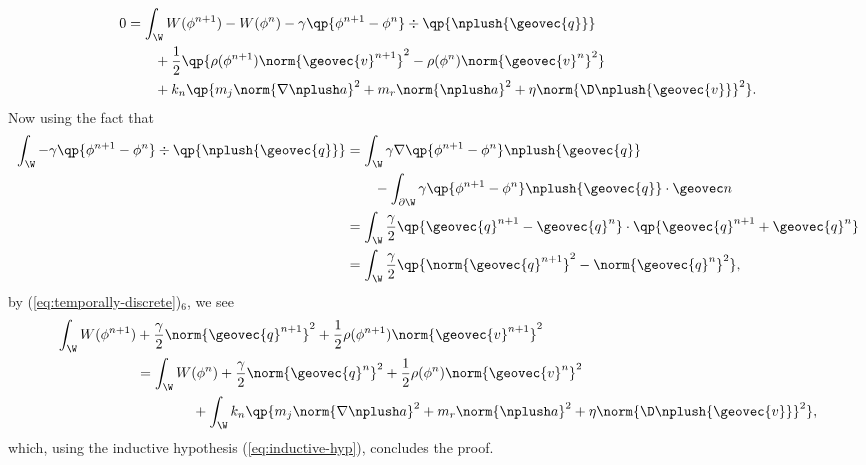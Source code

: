 \documentclass[final]{amsart}
\numberwithin{equation}{section}
\begin{document}
\begin{Proof}
\begin{equation}
    \begin{split}
      0
      &=
      \int_\W
      W(\phi^{n+1}) - W(\phi^n)
      -
      \gamma \qp{\phi^{n+1} - \phi^n} \div\qp{\nplush {{\geovec{q}}}}
      \\
      &\qquad +
      \frac{1}{2}\qp{\rho(\phi^{n+1})\norm{{\geovec{v}}^{n+1}}^2 - \rho(\phi^n) \norm{{\geovec{v}}^n}^2}    
      \\
      &\qquad 
      +
      k_n \qp{m_j\norm{\nabla \nplush a}^2
        +
        m_r \norm{\nplush a}^2
        +
        \eta \norm{\D \nplush{{\geovec{v}}}}^2}.
    \end{split}
  \end{equation}
  Now using the fact that
  \begin{equation}
    \begin{split}
      \int_\W - \gamma \qp{\phi^{n+1} - \phi^n} \div\qp{\nplush {{\geovec{q}}}} &= 
      \int_\W \gamma \nabla \qp{\phi^{n+1} - \phi^n}
      \nplush {{\geovec{q}}}
      \\
      &\qquad
      - 
      \int_{\partial\W} \gamma \qp{\phi^{n+1} - \phi^n}
      \nplush {{\geovec{q}}} \cdot \geovec n
      \\
      &=
      \int_\W \frac{\gamma}{2} \qp{{\geovec{q}}^{n+1} - {\geovec{q}}^n} \cdot
      \qp{{\geovec{q}}^{n+1} + {\geovec{q}}^n}
      \\
      &=
      \int_\W \frac{\gamma}{2} \qp{\norm{{\geovec{q}}^{n+1}}^2 - \norm{{\geovec{q}}^n}^2},
    \end{split}
  \end{equation}
  by (\ref{eq:temporally-discrete})$_6$, we see
  \begin{equation}
    \begin{split}
      \int_\W
      W(\phi^{n+1})
      &+
      \frac{\gamma}{2} \norm{{\geovec{q}}^{n+1}}^2
      +
      \frac{1}{2}\rho(\phi^{n+1})\norm{{\geovec{v}}^{n+1}}^2
      \\
      &=
      \int_\W
      W(\phi^n)
      +
      \frac{\gamma}{2} \norm{{\geovec{q}}^{n}}^2
      +
      \frac{1}{2}\rho(\phi^n)\norm{{\geovec{v}}^n}^2
      \\
      &\qquad\qquad
      +
      \int_\W
      k_n \qp{m_j\norm{\nabla \nplush a}^2
        +
        m_r \norm{\nplush a}^2
        +
        \eta \norm{\D \nplush{{\geovec{v}}}}^2},
    \end{split}
  \end{equation}
  which, using the inductive hypothesis (\ref{eq:inductive-hyp}), concludes the proof.
\end{Proof}
\end{document}
